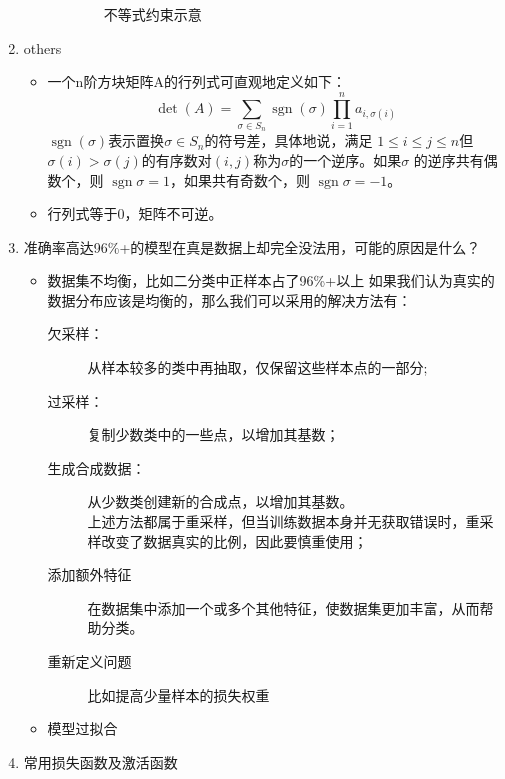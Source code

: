 \documentclass[UTF8]{article}%
\begin{document}
\begin{enumerate}
\begin{description}
\begin{figure}[h]
					\caption{不等式约束示意}  %
					\label{KKT-IECD}   %
				\end{figure}
				\clearpage
			\end{description}
			\item others
			\begin{itemize}
				\item 一个n阶方块矩阵A的行列式可直观地定义如下：
				$$
				\operatorname{det}(A)=\sum_{\sigma \in S_{n}} \operatorname{sgn}(\sigma) \prod_{i=1}^{n} a_{i, \sigma(i)}
				$$
				${\displaystyle \operatorname {sgn}(\sigma )}$表示置换$ {\displaystyle \sigma \in S_{n}} $的符号差，具体地说，满足 ${\displaystyle 1\leq i\leq j\leq n}$但 ${\displaystyle \sigma (i)>\sigma (j)}$的有序数对${\displaystyle \left(i,j\right)} $称为$\sigma $的一个逆序。如果$ \sigma$ 的逆序共有偶数个，则 ${\displaystyle \operatorname {sgn} \sigma =1} $，如果共有奇数个，则 ${\displaystyle \operatorname {sgn} \sigma =-1} $。
				\item 行列式等于0，矩阵不可逆。
			\end{itemize}
			
			\color{black}
			\item 准确率高达96\%+的模型在真是数据上却完全没法用，可能的原因是什么？
				\begin{itemize}
					\item 数据集不均衡，比如二分类中正样本占了96\%+以上
						如果我们认为真实的数据分布应该是均衡的，那么我们可以采用的解决方法有：
						\begin{description}
							\item[欠采样：] 从样本较多的类中再抽取，仅保留这些样本点的一部分;
							\item[过采样：] 复制少数类中的一些点，以增加其基数；
							\item[生成合成数据：] 从少数类创建新的合成点，以增加其基数。
							\\上述方法都属于重采样，但当训练数据本身并无获取错误时，重采样改变了数据真实的比例，因此要慎重使用；
							\item[添加额外特征] 在数据集中添加一个或多个其他特征，使数据集更加丰富，从而帮助分类。
							\item[重新定义问题] 比如提高少量样本的损失权重
						\end{description}
					\item 模型过拟合
				\end{itemize}
			\item 常用损失函数及激活函数
		\end{enumerate}
\end{document}
